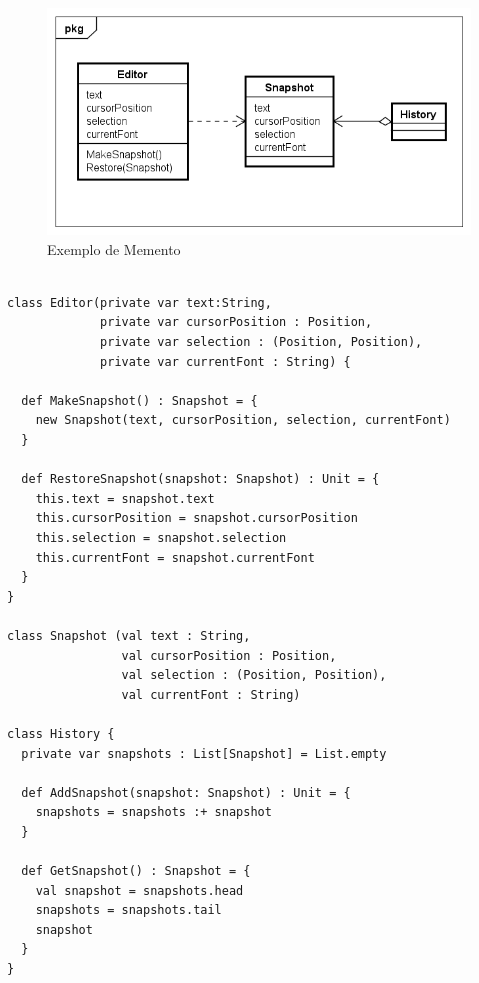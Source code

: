 \begin{figure}[htb]
	\caption{\label{memento_exemplo}Exemplo de Memento}
	\begin{center}
	    \includegraphics[scale=0.5]{5_padroes-contexto-funcional/5.3_comportamentais/5.3.06_memento/memento_exemplo.png}
	\end{center}
\end{figure}

\begin{lstlisting}[caption={Memento Orientação a Objetos},label=oomemento]

class Editor(private var text:String,
             private var cursorPosition : Position,
             private var selection : (Position, Position),
             private var currentFont : String) {

  def MakeSnapshot() : Snapshot = {
    new Snapshot(text, cursorPosition, selection, currentFont)
  }

  def RestoreSnapshot(snapshot: Snapshot) : Unit = {
    this.text = snapshot.text
    this.cursorPosition = snapshot.cursorPosition
    this.selection = snapshot.selection
    this.currentFont = snapshot.currentFont
  }
}

class Snapshot (val text : String,
                val cursorPosition : Position,
                val selection : (Position, Position),
                val currentFont : String)
                
class History {
  private var snapshots : List[Snapshot] = List.empty

  def AddSnapshot(snapshot: Snapshot) : Unit = {
    snapshots = snapshots :+ snapshot
  }

  def GetSnapshot() : Snapshot = {
    val snapshot = snapshots.head
    snapshots = snapshots.tail
    snapshot
  }
}

\end{lstlisting}

